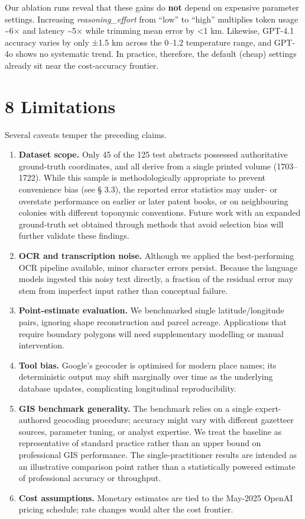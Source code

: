 \documentclass[
  11pt,
]{article}
\providecommand{\tightlist}{%
  \setlength{\itemsep}{0pt}\setlength{\parskip}{0pt}}
\begin{document}
Our ablation runs reveal that these gains do \textbf{not} depend on
expensive parameter settings. Increasing \emph{reasoning\_effort} from
``low'' to ``high'' multiplies token usage \textasciitilde6× and latency
\textasciitilde5× while trimming mean error by \textless1 km. Likewise,
GPT-4.1 accuracy varies by only ±1.5 km across the 0--1.2 temperature
range, and GPT-4o shows no systematic trend. In practice, therefore, the
default (cheap) settings already sit near the cost-accuracy frontier.

\section{8 Limitations}\label{limitations}

Several caveats temper the preceding claims.

\begin{enumerate}
\def\labelenumi{\arabic{enumi}.}
\tightlist
\item
  \textbf{Dataset scope.} Only 45 of the 125 test abstracts possessed
  authoritative ground-truth coordinates, and all derive from a single
  printed volume (1703--1722). While this sample is methodologically
  appropriate to prevent convenience bias (see § 3.3), the reported
  error statistics may under- or overstate performance on earlier or
  later patent books, or on neighbouring colonies with different
  toponymic conventions. Future work with an expanded ground-truth set
  obtained through methods that avoid selection bias will further
  validate these findings.
\item
  \textbf{OCR and transcription noise.} Although we applied the
  best-performing OCR pipeline available, minor character errors
  persist. Because the language models ingested this noisy text
  directly, a fraction of the residual error may stem from imperfect
  input rather than conceptual failure.
\item
  \textbf{Point-estimate evaluation.} We benchmarked single
  latitude/longitude pairs, ignoring shape reconstruction and parcel
  acreage. Applications that require boundary polygons will need
  supplementary modelling or manual intervention.
\item
  \textbf{Tool bias.} Google's geocoder is optimised for modern place
  names; its deterministic output may shift marginally over time as the
  underlying database updates, complicating longitudinal
  reproducibility.
\item
  \textbf{GIS benchmark generality.} The benchmark relies on a single
  expert-authored geocoding procedure; accuracy might vary with
  different gazetteer sources, parameter tuning, or analyst expertise.
  We treat the baseline as representative of standard practice rather
  than an upper bound on professional GIS performance. The
  single-practitioner results are intended as an illustrative comparison
  point rather than a statistically powered estimate of professional
  accuracy or throughput.
\item
  \textbf{Cost assumptions.} Monetary estimates are tied to the May-2025
  OpenAI pricing schedule; rate changes would alter the cost frontier.
\end{enumerate}
\end{document}
